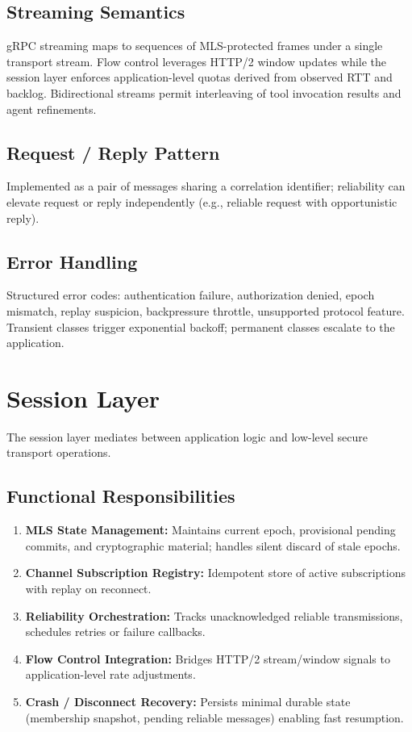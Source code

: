 \documentclass{article}
\theoremstyle{definition}
\theoremstyle{remark}
\begin{document}
\subsection{Streaming Semantics}
gRPC streaming maps to sequences of MLS-protected frames under a single
transport stream. Flow control leverages HTTP/2 window updates while the
session layer enforces application-level quotas derived from observed RTT and
backlog. Bidirectional streams permit interleaving of tool invocation results
and agent refinements.
\subsection{Request / Reply Pattern}
Implemented as a pair of messages sharing a correlation identifier; reliability
can elevate request or reply independently (e.g., reliable request with
opportunistic reply).
\subsection{Error Handling}
Structured error codes: authentication failure, authorization denied, epoch
mismatch, replay suspicion, backpressure throttle, unsupported protocol
feature. Transient classes trigger exponential backoff; permanent classes
escalate to the application.

\section{Session Layer}\label{sec:session}
The session layer mediates between application logic and low-level secure
transport operations.
\subsection{Functional Responsibilities}
\begin{enumerate}[leftmargin=*]
  \item \textbf{MLS State Management:} Maintains current epoch, provisional pending commits, and cryptographic material; handles silent discard of stale epochs.
  \item \textbf{Channel Subscription Registry:} Idempotent store of active subscriptions with replay on reconnect.
  \item \textbf{Reliability Orchestration:} Tracks unacknowledged reliable transmissions, schedules retries or failure callbacks.
  \item \textbf{Flow Control Integration:} Bridges HTTP/2 stream/window signals to application-level rate adjustments.
  \item \textbf{Crash / Disconnect Recovery:} Persists minimal durable state (membership snapshot, pending reliable messages) enabling fast resumption.
\end{enumerate}
\end{document}

